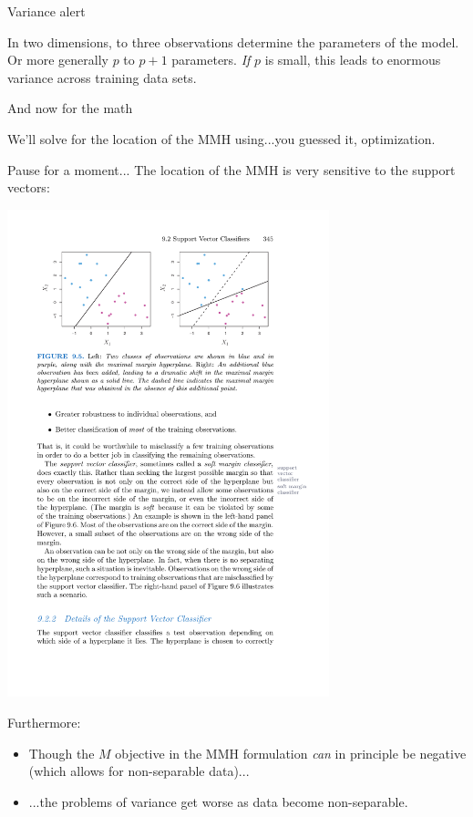 \documentclass[mathserif, aspectratio=169]{beamer}
\begin{document}
\begin{frame}{Variance alert}

In two dimensions, to three observations determine the parameters of the model.  Or more generally $p$ to $p+1$ parameters.  \textit{If} $p$ is small, this leads to enormous variance across training data sets.   
\end{frame}

\begin{frame}{And now for the math}

We'll solve for the location of the MMH using...\pause you guessed it, optimization.  

\vspace{40mm}

\end{frame}

\begin{frame}{Pause for a moment...}
The location of the MMH is very sensitive to the support vectors:

\includegraphics[width=0.7\textwidth]{ISLR_9point5}

Furthermore:
\begin{itemize}
\item Though the $M$ objective in the MMH formulation \textit{can} in principle be negative (which allows for non-separable data)...
\item ...the problems of variance get worse as data become non-separable.
\end{itemize}
\end{frame}
\end{document}
